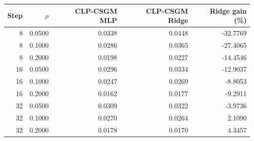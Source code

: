 \begin{tabular}{rrrrr}
\toprule
Step & $\rho$ & CLP-CSGM MLP & CLP-CSGM Ridge & Ridge gain (\%) \\
\midrule
8 & 0.0500 & 0.0338 & 0.0448 & -32.7769 \\
8 & 0.1000 & 0.0286 & 0.0365 & -27.4065 \\
8 & 0.2000 & 0.0198 & 0.0227 & -14.4546 \\
16 & 0.0500 & 0.0296 & 0.0334 & -12.9037 \\
16 & 0.1000 & 0.0247 & 0.0269 & -8.8053 \\
16 & 0.2000 & 0.0162 & 0.0177 & -9.2911 \\
32 & 0.0500 & 0.0309 & 0.0322 & -3.9736 \\
32 & 0.1000 & 0.0270 & 0.0264 & 2.1090 \\
32 & 0.2000 & 0.0178 & 0.0170 & 4.3457 \\
\bottomrule
\end{tabular}
